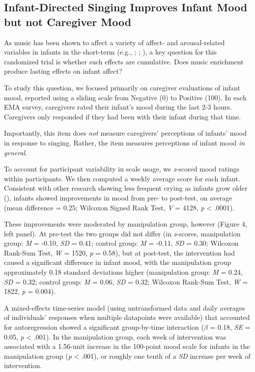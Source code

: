\documentclass[
]{article}
\begin{document}
\subsection{Infant-Directed Singing Improves Infant Mood but not
Caregiver
Mood}\label{infant-directed-singing-improves-infant-mood-but-not-caregiver-mood}

As music has been shown to affect a variety of affect- and
arousal-related variables in infants in the short-term (e.g.,
;
;
), a key question for
this randomized trial is whether such effects are cumulative. Does music
enrichment produce lasting effects on infant affect?

To study this question, we focused primarily on caregiver evaluations of
infant mood, reported using a sliding scale from Negative (0) to
Positive (100). In each EMA survey, caregivers rated their infant's mood
during the last 2-3 hours. Caregivers only responded if they had been
with their infant during that time.

Importantly, this item does \emph{not} measure caregivers' perceptions
of infants' mood in response to singing. Rather, the item measures
perceptions of infant mood \emph{in general}.

To account for participant variability in scale usage, we
\emph{z}-scored mood ratings within participants. We then computed a
weekly average score for each infant. Consistent with other research
showing less frequent crying as infants grow older
(), infants showed improvements in
mood from pre- to post-test, on average (mean difference = 0.25;
Wilcoxon Signed Rank Test, \emph{V} = 4128, \emph{p} \textless{} .0001).

These improvements were moderated by manipulation group, however (Figure
4, left panel). At pre-test the two groups did not differ (in
\emph{z}-scores, manipulation group: \emph{M} = -0.10, \emph{SD} = 0.41;
control group: \emph{M} = -0.11, \emph{SD} = 0.30; Wilcoxon Rank-Sum
Test, \emph{W} = 1520, \emph{p} = 0.58), but at post-test, the
intervention had caused a significant difference in infant mood, with
the manipulation group approximately 0.18 standard deviations higher
(manipulation group: \emph{M} = 0.24, \emph{SD} = 0.32; control group:
\emph{M} = 0.06, \emph{SD} = 0.32; Wilcoxon Rank-Sum Test, \emph{W} =
1822, \emph{p} = 0.004).

A mixed-effects time-series model (using untransformed data and daily
averages of individuals' responses when multiple datapoints were
available) that accounted for autoregression showed a significant
group-by-time interaction (\(\beta\) = 0.18, \emph{SE} = 0.05, \emph{p}
\textless{} .001). In the manipulation group, each week of intervention
was associated with a 1.56-unit increase in the 100-point mood scale for
infants in the manipulation group (\emph{p} \textless{} .001), or
roughly one tenth of a \emph{SD} increase per week of intervention.
\end{document}
